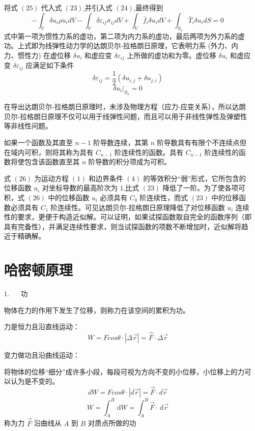 \documentclass[12pt,a4paper]{article}
\begin{document}
将式 $(25)$ 代入式 $(23)$,并引入式 $(24)$,最终得到
\begin{equation}
-\int_{V}\delta u_i\rho\ddot{u}_idV-\int_{V}\delta\varepsilon_{ij}\sigma_{ij}dV+\int_{V} \bar{f}_i\delta u_idV+\int_{S_{\sigma}}\bar{T}_i\delta u_idS=0
\end{equation}
式中第一项为惯性力系的虚功，第二项为内力系的虚功，最后两项为外力系的虚功。上式即为线弹性动力学的达朗贝尔-拉格朗日原理，它表明力系 (外力、内力、惯性力) 在虚位移 $\delta u_i$ 和虚应变 $\delta\varepsilon_{ij}$ 上所做的虚功和为零。虚位移 $\delta u_i$ 和虚应变 $\delta\varepsilon_{ij}$ 应满足如下条件
\begin{equation}
\delta\varepsilon_{ij}=\frac{1}{2}(\delta u_{i,j}+\delta u_{j,i})
\end{equation}
\begin{equation}
\delta u_i|_{S_u}=0
\end{equation}

在导出达朗贝尔-拉格朗日原理时，未涉及物理方程（应力-应变关系），所以达朗贝尔-拉格朗日原理不仅可以用于线弹性问题，而且可以用于非线性弹性及弹塑性等非线性问题。

如果一个函数及其直至 $n−1$ 阶导数连续，其第 $n$ 阶导数具有有限个不连续点但在域内可积，则将其称为具有 $C_{n−1}$ 阶连续性的函数。具有 $C_{n−1}$ 阶连续性的函数将使包含该函数直至其 $n$ 阶导数的积分项成为可积。

式 $(26)$ 为运动方程 $(1)$ 和边界条件 $(4)$ 的等效积分“弱”形式，它所包含的位移函数 $u_i$ 对坐标导数的最高阶次为 $1$,比式 $(23)$ 降低了一阶。为了使各项可积，式 $(26)$ 中的位移函数 $u_i$ 必须具有 $C_0$ 阶连续性，而式 $(23)$ 中的位移函数必须具有 $C_1$ 阶连续性。可见达朗贝尔-拉格朗日原理降低了对位移函数 $u_i$ 连续性的要求，更便于构造近似解。可以证明，如果试探函数取自完全的函数序列（即具有完备性），并满足连续性要求，则当试探函数的项数不断增加时，近似解将趋近于精确解。

\section{哈密顿原理}
$1$. ~~ 功

物体在力的作用下发生了位移，则称力在该空间的累积为功。

力是恒力且沿直线运动：
$$
W=Fcos\theta\cdot\left|\Delta\overrightarrow{r}\right|=\overrightarrow{F}\cdot\Delta\overrightarrow{r}
$$

变力做功且沿曲线运动：

将物体的位移“细分”成许多小段，每段可视为方向不变的小位移，小位移上的力可以认为是不变的。
$$
dW=Fcos\theta\cdot\left|d\overrightarrow{r}\right|=\overrightarrow{F}\cdot d\overrightarrow{r}
$$
$$
W=\int_{A}^{B} \, \mathrm{d}W=\int_{A}^{B} \overrightarrow{F}\cdot \, \mathrm{d}\overrightarrow{r}
$$
称为力 $\overrightarrow{F}$ 沿曲线从 $A$ 到 $B$ 对质点所做的功
\end{document}
